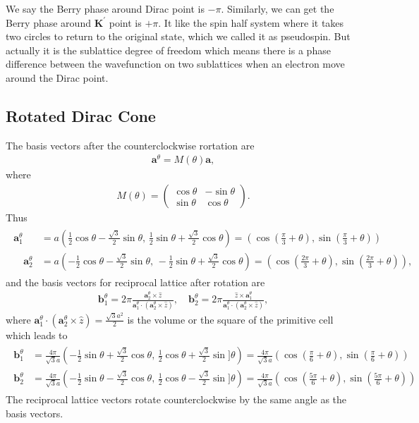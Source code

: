 \documentclass[10pt, oneside]{article}
\newcommand{\te}{\theta}
\newcommand{\p}[1]{\left(#1\right)}
\begin{document}
We say the Berry phase around Dirac point is \(-\pi\). Similarly, we can get the Berry phase around \(\bm{K}^{\prime}\) point is \(+\pi\). It like the spin half system where it takes two circles to return to the original state, which we called it as pseudospin. But actually it is the sublattice degree of freedom which means there is a phase difference between the wavefunction on two sublattices when an electron move around the Dirac point.


\subsection{Rotated Dirac Cone}
The basis vectors after the counterclockwise rortation are 
\begin{align}
	\bm{a}^{\te} = M\p{\te} \bm{a},
\end{align}
where 
\begin{align}
	M\p{\te} = \begin{pmatrix}
		\cos \te & -\sin \te \\
		\sin \te & \cos \te 
	\end{pmatrix}.
\end{align}
Thus 
\begin{align}
	\begin{split}
		\bm{a}^{\te}_{1} &= a \p{\frac{1}{2} \cos\te -\frac{\sqrt{3}}{2} \sin \te,\, \frac{1}{2} \sin \te + \frac{\sqrt{3}}{2} \cos \te} = \p{\cos \p{\frac{\pi}{3} + \te }, \sin \p{\frac{\pi}{3} + \te }}\\ \quad \bm{a}^{\te}_{2} &= a \p{-\frac{1}{2} \cos\te -\frac{\sqrt{3}}{2} \sin \te,\, -\frac{1}{2} \sin \te + \frac{\sqrt{3}}{2} \cos \te } = \p{\cos \p{\frac{2\pi}{3} + \te }, \sin \p{\frac{2\pi}{3} + \te }},
	\end{split}
\end{align}
and the basis vectors for reciprocal lattice after rotation are 
\begin{align}
	\bm{b}^{\te}_{1} = 2 \pi \frac{ \bm{a}^{\te}_{2} \times \hat{z}}{ \bm{a}^{\te}_{1} \cdot \p{\bm{a}^{\te}_{2} \times \hat{z}}},\quad \bm{b}^{\te}_{2} = 2 \pi \frac{\hat{z} \times \bm{a}^{\te}_{1}}{ \bm{a}^{\te}_{1} \cdot \p{\bm{a}^{\te}_{2} \times \hat{z}}},
\end{align}
where \(\bm{a}^{\te}_{1} \cdot \p{\bm{a}^{\te}_{2} \times \hat{z}} = \frac{\sqrt{3} a^{2}}{2}\) is the volume or the square of the primitive cell which leads to 
\begin{align}
	\begin{split}
		\bm{b}^{\te}_{1} &= \frac{4 \pi}{\sqrt{3} a}\p{-\frac{1}{2} \sin \te + \frac{\sqrt{3}}{2} \cos \te, \, \frac{1}{2} \cos \te + \frac{\sqrt{3}}{2} \sin ]\te} = \frac{4 \pi}{\sqrt{3} a} \p{\cos\p{\frac{\pi}{6} + \te}, \sin\p{\frac{\pi}{6} + \te}} \\
		\bm{b}^{\te}_{2} &= \frac{4 \pi}{\sqrt{3} a}\p{-\frac{1}{2} \sin \te - \frac{\sqrt{3}}{2} \cos \te, \, \frac{1}{2} \cos \te - \frac{\sqrt{3}}{2} \sin ]\te} = \frac{4 \pi}{\sqrt{3} a} \p{\cos\p{\frac{5\pi}{6} + \te}, \sin\p{\frac{5\pi}{6} + \te}}
	\end{split}
\end{align}
The reciprocal lattice vectors rotate counterclockwise by the same angle as the basis vectors. 
\end{document}
